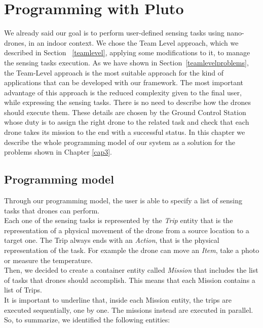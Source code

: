 \chapter{Programming with Pluto}
\label{cap4}

We already said our goal is to perform user-defined sensing tasks using nano-drones, in an indoor context.
We chose the Team Level approach, which we described in Section ~\ref{teamlevel}, applying some modifications to it, to manage the sensing tasks execution.
As we have shown in Section~\ref{teamlevelproblems}, the Team-Level approach is the most suitable approach for the kind of applications that can be developed with our framework.
The most important advantage of this approach is the reduced complexity given to the final user, while expressing the sensing tasks.
There is no need to describe how the drones should execute them.
These details are chosen by the Ground Control Station whose duty is to assign the right drone to the related task and check that each drone takes its mission to the end with a successful status.
In this chapter we describe the whole programming model of our system as a solution for the problems shown in Chapter \ref{cap3}.


\section{Programming model}\label{programmingModel}

Through our programming model, the user is able to specify a list of sensing tasks that drones can perform.\\
Each one of the sensing tasks is represented by the \textit{Trip} entity that is the representation of a physical movement of the drone from a source location to a target one. The Trip always ends with an \textit{Action}, that is the physical representation of the task. For example the drone can move an \textit{Item}, take a photo or measure the temperature.
\\
Then, we decided to create a container entity called \textit{Mission} that includes the list of tasks that drones should accomplish. This means that each Mission contains a list of Trips.
\\
It is important to underline that, inside each Mission entity, the trips are executed sequentially, one by one. The missions instead are executed in parallel.
\\

So, to summarize, we identified the following entities:

